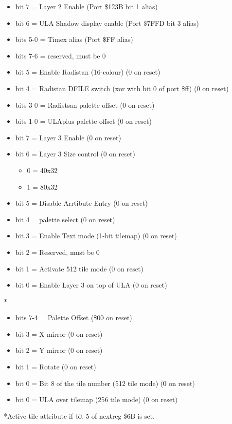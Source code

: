 \begin{itemize}
\item bit 7 = Layer 2 Enable (Port \$123B bit 1 alias)
\item bit 6 = ULA Shadow display enable (Port \$7FFD bit 3 alias)
\item bits 5-0 = Timex alias (Port \$FF alias)
\end{itemize}

\begin{itemize}
\item bits 7-6 = reserved, must be 0
\item bit 5 = Enable Radistan (16-colour) (0 on reset)
\item bit 4 = Radistan DFILE switch (xor with bit 0 of port \$ff) (0
  on reset)
\item bits 3-0 = Radistsan palette offset (0 on reset)
\item bits 1-0 = ULAplus palette offset (0 on reset)
\end{itemize}

\begin{itemize}
\item bit 7 = Layer 3 Enable (0 on reset)
\item bit 6 = Layer 3 Size control (0 on reset)
  \begin{itemize}
  \item 0 = 40x32
  \item 1 = 80x32
  \end{itemize}
\item bit 5 = Disable Arrtibute Entry (0 on reset)
\item bit 4 = palette select (0 on reset)
\item bit 3 = Enable Text mode (1-bit tilemap) (0 on reset)
\item bit 2 = Reserved, must be 0
\item bit 1 = Activate 512 tile mode (0 on reset)
\item bit 0 = Enable Layer 3 on top of ULA (0 on reset)
\end{itemize}

*
\begin{itemize}
\item bits 7-4 = Palette Offset (\$00 on reset)
\item bit 3 = X mirror (0 on reset)
\item bit 2 = Y mirror (0 on reset)
\item bit 1 = Rotate (0 on reset)
\item bit 0 = Bit 8 of the tile number (512 tile mode) (0 on reset)
\item bit 0 = ULA over tilemap (256 tile mode) (0 on reset)
\end{itemize}
*Active tile attribute if bit 5 of nextreg \$6B is set.

